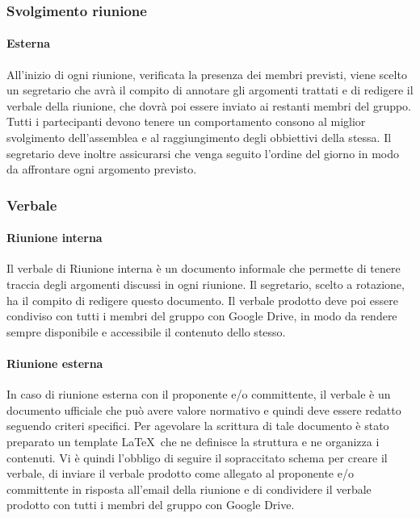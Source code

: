 \documentclass[../NormeDiProgetto.tex]{subfiles}
\begin{document}
				\subsubsection{Svolgimento riunione}
					\paragraph{Esterna\\}
						All'inizio di ogni riunione, verificata la presenza dei membri previsti, viene scelto un segretario che avrà il compito di annotare gli argomenti trattati e di redigere il verbale della riunione, che dovrà poi essere inviato ai restanti membri del gruppo. 
						Tutti i partecipanti devono tenere un comportamento consono al miglior svolgimento dell'assemblea e al raggiungimento degli obbiettivi della stessa. Il segretario deve inoltre assicurarsi che venga seguito l'ordine del giorno in modo da affrontare ogni argomento previsto.
				\subsubsection{Verbale}
					\paragraph{Riunione interna\\}
						Il verbale di Riunione interna è un documento informale che permette di tenere traccia degli argomenti discussi in ogni riunione. Il segretario, scelto a rotazione, ha il compito di redigere questo documento. Il verbale prodotto deve poi essere condiviso con tutti i membri del gruppo con Google Drive, in modo da rendere sempre disponibile e accessibile il contenuto dello stesso.
					\paragraph{Riunione esterna\\}
						In caso di riunione esterna con il proponente e/o committente, il verbale è un documento ufficiale che può avere valore normativo e quindi deve essere redatto seguendo criteri specifici.
						Per agevolare la scrittura di tale documento è stato preparato un template \LaTeX\ che ne definisce la struttura e ne organizza i contenuti. Vi è quindi l'obbligo di seguire il sopraccitato schema per creare il verbale, di inviare il verbale prodotto come allegato al proponente e/o committente in risposta all'email della riunione e di condividere il 
						verbale prodotto con tutti i membri del gruppo con Google Drive.
\end{document}
